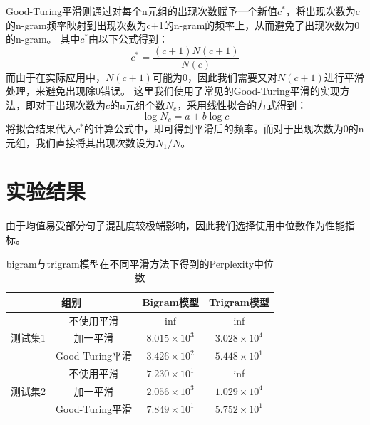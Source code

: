 \documentclass[twoside,11pt]{article}
\begin{document}
Good-Turing平滑则通过对每个n元组的出现次数赋予一个新值$c^*$，将出现次数为c的n-gram频率映射到出现次数为c+1的n-gram的频率上，从而避免了出现次数为0的n-gram。
其中$c^*$由以下公式得到：
\begin{equation}
  c^* = \frac{(c+1)N(c+1)}{N(c)}
\end{equation}
而由于在实际应用中，$N(c+1)$可能为0，因此我们需要又对$N(c+1)$进行平滑处理，来避免出现除0错误。
这里我们使用了常见的Good-Turing平滑的实现方法，即对于出现次数为$c$的n元组个数$N_c$，采用线性拟合的方式得到：
\begin{equation}
  \log N_c = a + b \log c
\end{equation}
将拟合结果代入$c^*$的计算公式中，即可得到平滑后的频率。而对于出现次数为0的n元组，我们直接将其出现次数设为$N_1/N$。


\section{实验结果}
由于均值易受部分句子混乱度较极端影响，因此我们选择使用中位数作为性能指标。
\begin{table}[htbp]
  \renewcommand{\multirowsetup}{\centering}
  \caption{bigram与trigram模型在不同平滑方法下得到的Perplexity中位数}
  \label{tab:hyperparams}
  \vspace{5pt}
  \centering
  \begin{tabular}{cccc}
    \toprule
    \multicolumn{2}{c}{组别} & Bigram模型      & Trigram模型                               \\
    \midrule
    \multirow{3}{*}{测试集1} & 不使用平滑      & inf                 & inf                 \\
                             & 加一平滑        & $8.015 \times 10^3$ & $3.028 \times 10^4$ \\
                             & Good-Turing平滑 & $3.426 \times 10^2$ & $5.448 \times 10^1$ \\
    \midrule
    \multirow{3}{*}{测试集2} & 不使用平滑      & $7.230 \times 10^1$ & inf                 \\
                             & 加一平滑        & $2.056\times 10^3$  & $1.029 \times 10^4$ \\
                             & Good-Turing平滑 & $7.849 \times 10^1$ & $5.752 \times 10^1$ \\
    \bottomrule
  \end{tabular}
\end{table}
\end{document}
